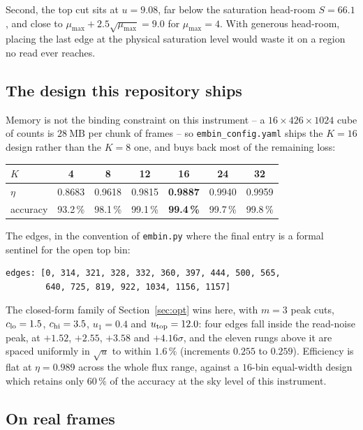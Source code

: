 \documentclass[11pt,a4paper]{article}
\begin{document}
Second, the top cut sits at $u = 9.08$, far below the saturation head-room
$S = 66.1$, and close to $\mu_{\max} + 2.5\sqrt{\mu_{\max}} = 9.0$ for
$\mu_{\max}=4$. With generous head-room, placing the last edge at the physical
saturation level would waste it on a region no read ever reaches.

\subsection{The design this repository ships}
\label{sec:shipped}

Memory is not the binding constraint on this instrument -- a $16 \times 426
\times 1024$ cube of counts is $28\ \mathrm{MB}$ per chunk of frames -- so
\texttt{embin\_config.yaml} ships the $K = 16$ design rather than the $K = 8$
one, and buys back most of the remaining loss:

\begin{center}
\small
\begin{tabular}{lcccccc}
\toprule
$K$ & 4 & 8 & 12 & 16 & 24 & 32\\
\midrule
$\eta$ & 0.8683 & 0.9618 & 0.9815 & \textbf{0.9887} & 0.9940 & 0.9959\\
accuracy & 93.2\,\% & 98.1\,\% & 99.1\,\% & \textbf{99.4\,\%} & 99.7\,\% & 99.8\,\%\\
\bottomrule
\end{tabular}
\end{center}

\noindent The edges, in the convention of \texttt{embin.py} where the final
entry is a formal sentinel for the open top bin:

\begin{lstlisting}
edges: [0, 314, 321, 328, 332, 360, 397, 444, 500, 565,
        640, 725, 819, 922, 1034, 1156, 1157]
\end{lstlisting}

The closed-form family of Section~\ref{sec:opt} wins here, with $m = 3$
peak cuts, $c_{\rm lo} = 1.5$, $c_{\rm hi} = 3.5$, $u_1 = 0.4$ and
$u_{\rm top} = 12.0$: four edges fall inside the read-noise peak, at $+1.52$,
$+2.55$, $+3.58$ and $+4.16\sigma$, and the eleven rungs above it are spaced
uniformly in $\sqrt{u}$ to within $1.6\,\%$ (increments $0.255$ to $0.259$).
Efficiency is flat at $\eta = 0.989$ across the whole flux range, against a
$16$-bin equal-width design which retains only $60\,\%$ of the accuracy at the
sky level of this instrument.

\subsection{On real frames}
\end{document}
